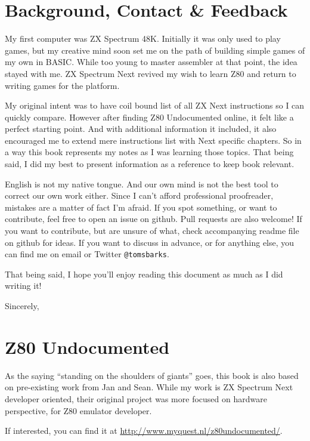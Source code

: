 \pagebreak %
\section{Background, Contact \& Feedback}

My first computer was ZX Spectrum 48K. Initially it was only used to play games, but my creative mind soon set me on the path of building simple games of my own in BASIC. While too young to master assembler at that point, the idea stayed with me. ZX Spectrum Next revived my wish to learn Z80 and return to writing games for the platform.
	
My original intent was to have coil bound list of all ZX Next instructions so I can quickly compare. However after finding Z80 Undocumented online, it felt like a perfect starting point. And with additional information it included, it also encouraged me to extend mere instructions list with Next specific chapters. So in a way this book represents my notes as I was learning those topics. That being said, I did my best to present information as a reference to keep book relevant.

English is not my native tongue. And our own mind is not the best tool to correct our own work either. Since I can't afford professional proofreader, mistakes are a matter of fact I'm afraid. If you spot something, or want to contribute, feel free to open an issue on github. Pull requests are also welcome! If you want to contribute, but are unsure of what, check accompanying readme file on github for ideas. If you want to discuss in advance, or for anything else, you can find me on email  or Twitter {\tt @tomsbarks}.

That being said, I hope you'll enjoy reading this document as much as I did writing it!

Sincerely, \AuthorName


\pagebreak
\section{Z80 Undocumented}

As the saying ``standing on the shoulders of giants'' goes, this book is also based on pre-existing work from Jan and Sean. While my work is ZX Spectrum Next developer oriented, their original project was more focused on hardware perspective, for Z80 emulator developer.

If interested, you can find it at \url{http://www.myquest.nl/z80undocumented/}.

